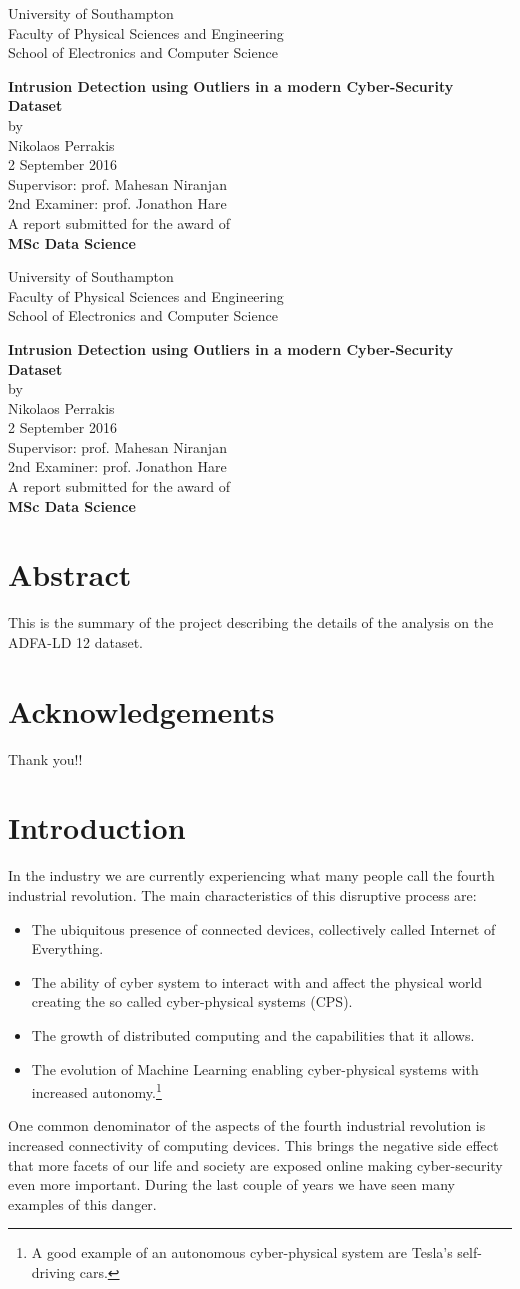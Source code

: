 \documentclass[reqno,openany,12pt]{amsbook}
\newcommand\mycustomtitle{%
\begin{titlepage}
\begin{center}
{\Large \textup{University of Southampton\\ \vspace{12pt}
	Faculty of Physical Sciences and Engineering\\ \vspace{12pt}
	School of Electronics and Computer Science}}\par
\vspace{72pt}
{\Large \textbf{
Intrusion Detection using Outliers in a modern Cyber-Security Dataset}
}\\
\vspace{36pt}
{\Large by}\\
\vspace{36pt}
{\Large Nikolaos Perrakis}
\\ \vspace{36pt}
{\Large 2 September 2016}
\\ \vspace{72pt}
{\Large
Supervisor: prof. Mahesan Niranjan\\ \vspace{8pt}
2nd Examiner: prof. Jonathon Hare}\\ \vspace{36pt}
{\Large A report submitted for the award of\\ \vspace{24pt}
\textbf{MSc Data Science}}
\end{center}
\end{titlepage}%
}
\begin{document}
\frontmatter
\mycustomtitle
\mycustomtitle


\afterpage{\null
	\thispagestyle{empty}
	\newpage} %



\chapter*{Abstract}
\setcounter{page}{1}
This is the summary of the project describing the details of the analysis on the ADFA-LD 12 dataset.



\chapter*{Acknowledgements}

Thank you!!


\tableofcontents
\listoffigures
\listoftables


\mainmatter

\chapter{Introduction}

In the industry we are currently experiencing what many people call the fourth industrial revolution. The main characteristics of this disruptive process are:
\begin{itemize}
\item The ubiquitous presence of connected devices, collectively called Internet of Everything.
\item The ability of cyber system to interact with and affect the physical world creating the so called cyber-physical systems (CPS).
\item The growth of distributed computing and the capabilities that it allows.
\item The evolution of Machine Learning enabling cyber-physical systems with increased autonomy.\footnote{A good example of an autonomous cyber-physical system are Tesla's self-driving cars.}
\end{itemize}
One common denominator of the aspects of the fourth industrial revolution is increased connectivity of computing devices. This brings the negative side effect that more facets of our life and society are exposed online making cyber-security even more important. During the last couple of years we have seen many examples of this danger.
\end{document}
